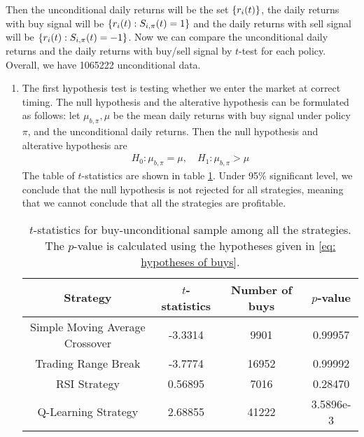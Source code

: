 \documentclass[11pt,a4paper]{article}
\numberwithin{equation}{section}
\newcommand{\set}[1]{\qty{#1}}
\begin{document}
Then the unconditional daily returns will be the set $\set{r_i (t)}$, the daily returns with buy signal will be $\set{r_i (t) : S_{i, \pi} (t) = 1}$ and the daily returns with sell signal will be $\set{r_i (t) : S_{i, \pi} (t) = -1}$. Now we can compare the unconditional daily returns and the daily returns with buy/sell signal by $t$-test for each policy. Overall, we have 1065222 unconditional data.

\begin{enumerate}
  \item
        The first hypothesis test is testing whether we enter the market at correct timing. The null hypothesis and the alterative hypothesis can be formulated as follows: let $\mu_{b, \pi}, \mu$ be the mean daily returns with buy signal under policy $\pi$, and the unconditional daily returns. Then the null hypothesis and alterative hypothesis are
        \begin{align} \label{eq: hypotheses of buys}
          H_0: \mu_{b, \pi} = \mu, \quad H_1: \mu_{b, \pi} > \mu
        \end{align}
        The table of $t$-statistics are shown in table \ref{table: t-statistics for buy-unconditional sample}. Under 95\% significant level, we conclude that the null hypothesis is not rejected for all strategies, meaning that we cannot conclude that all the strategies are profitable.
        \begin{table}[]
          \centering
          \begin{tabular}{@{}cccc@{}}
            \toprule
            Strategy                        & $t$-statistics & Number of buys & $p$-value \\ \midrule
            Simple Moving Average Crossover & -3.3314        & 9901           & 0.99957   \\
            Trading Range Break             & -3.7774        & 16952          & 0.99992   \\
            RSI Strategy                    & 0.56895        & 7016           & 0.28470   \\
            Q-Learning Strategy             & 2.68855        & 41222          & 3.5896e-3 \\ \bottomrule
          \end{tabular}
          \label{table: t-statistics for buy-unconditional sample}
          \caption{$t$-statistics for buy-unconditional sample among all the strategies. The $p$-value is calculated using the hypotheses given in \eqref{eq: hypotheses of buys}.}
        \end{table}


\end{enumerate}
\end{document}
